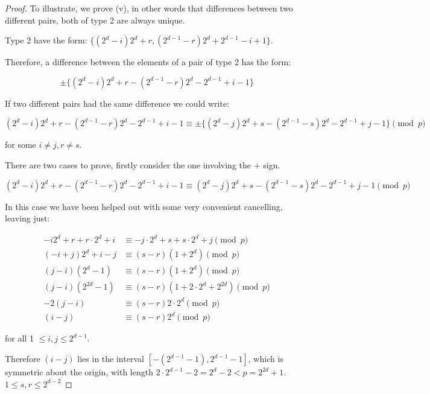\begin{proof}
To illustrate, we prove (v), in other words that differences between two different pairs, both of type 2 are always unique.

Type 2 have the form:
$\{(2^d - i)2^d + r, (2^{d - 1} - r)2^d + 2^{d - 1} - i + 1\}$.

Therefore, a difference between the elements of a pair of type 2 has the form:

\begin{equation}
  \pm \{(2^d - i)2^d + r - (2^{d - 1} - r)2^d - 2^{d - 1} + i - 1\}
\end{equation}

If two different pairs had the same difference we could write:

\begin{equation}
(2^d - i)2^d + r - (2^{d - 1} - r)2^d - 2^{d - 1} + i - 1 \equiv \pm \{(2^d - j)2^d + s - (2^{d - 1} - s)2^d - 2^{d - 1} + j - 1\}\pmod p
\end{equation}

for some $i \neq j, r \neq s$.

There are two cases to prove, firstly consider the one involving the + sign.

\begin{equation}
(2^d - i)2^d + r - (2^{d - 1} - r)2^d - 2^{d - 1} + i - 1 \equiv (2^d - j)2^d + s -(2^{d - 1} - s)2^d - 2^{d - 1} + j -1\pmod p
\end{equation}

In this case we have been helped out with some very convenient cancelling, leaving just:

\begin{align*}
  -i2^d + r + r \cdot 2^d + i &\equiv -j \cdot 2^d + s + s \cdot 2^d + j \pmod p \\
          (-i + j)2^d + i - j &\equiv (s - r)(1 + 2^d) \pmod p \\ 
             (j - i)(2^d - 1) &\equiv (s - r)(1 + 2^d) \pmod p \\
          (j - i)(2^{2d} - 1) &\equiv (s - r)(1 + 2 \cdot 2^d + 2^{2d}) \pmod p \\
                    -2(j - i) &\equiv (s - r) 2 \cdot 2^d \pmod p \\
                      (i - j) &\equiv (s - r) 2^d \pmod p
\end{align*}

for all 1 $\leq i, j \leq 2^{d-1}$.

Therefore $(i - j)$ lies in the interval
$[-(2^{d - 1} - 1), 2^{d - 1} - 1]$,
which is symmetric about the origin, with length
$2 \cdot 2^{d - 1} - 2 = 2^d - 2 < p = 2^{2d} + 1$.
$1 \leq s,r \leq 2^{d-2}$


\end{proof}
